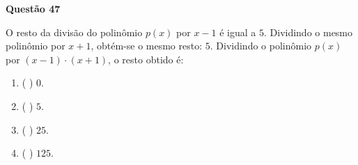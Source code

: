 {\bf Questão 47} 

O resto da divisão do polinômio $p(x)$ por $x-1$ é igual a $5$. Dividindo o mesmo polinômio
 por $x+1$, obtém-se o mesmo resto: $5$. Dividindo o polinômio $p(x)$ por $(x-1)\cdot (x+1)$, o resto obtido é:
\begin{multicols}{2}
\begin{enumerate}
		\item ( ) $0$.
		\item ( ) $5$.
		\item ( ) $25$.
		\item ( ) $125$.
		\end{enumerate}
\end{multicols}
